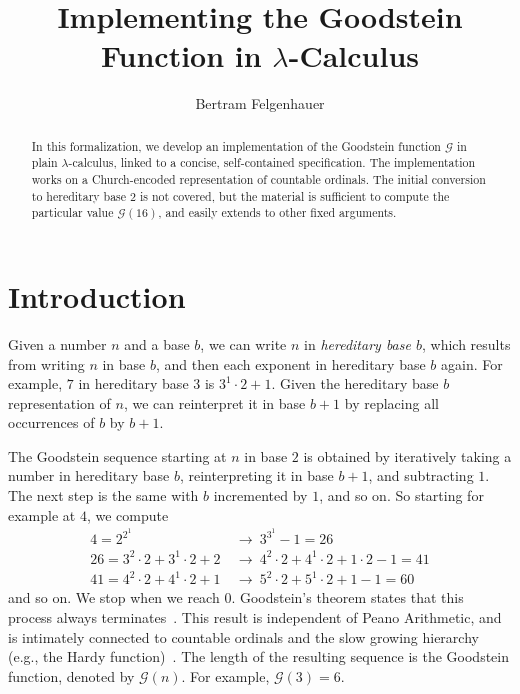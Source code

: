 \documentclass[11pt,a4paper]{article}
\begin{document}
\title{Implementing the Goodstein Function in $\lambda$-Calculus}
\author{Bertram Felgenhauer}
\maketitle

\begin{abstract}
In this formalization, we develop an implementation of the Goodstein
function $\mathcal{G}$ in plain $\lambda$-calculus, linked to a
concise, self-contained specification. The implementation works on a
Church-encoded representation of countable ordinals. The initial
conversion to hereditary base $2$ is not covered, but the material is
sufficient to compute the particular value $\mathcal{G}(16)$, and
easily extends to other fixed arguments.
\end{abstract}

\tableofcontents

\section{Introduction}

Given a number $n$ and a base $b$, we can write $n$ in
\emph{hereditary base $b$}, which results from writing $n$ in
base $b$, and then each exponent in hereditary base $b$ again.
For example, $7$ in hereditary base $3$ is $3^1 \cdot 2 + 1$.
Given the hereditary base $b$ representation of $n$,
we can reinterpret it in base $b+1$
by replacing all occurrences of $b$ by $b+1$.

The Goodstein sequence starting at $n$ in base $2$ is obtained by
iteratively taking a number in hereditary base $b$,
reinterpreting it in base $b+1$, and subtracting $1$.
The next step is the same with $b$ incremented by $1$, and so on.
So starting for example at $4$, we compute
\begin{align*}
4 = 2^{2^1}
&\:\to\: 3^{3^1} - 1
= 26\\
26 = 3^2 \cdot 2 + 3^1 \cdot 2 + 2
&\:\to\:
4^2 \cdot 2 + 4^1 \cdot 2 + 1 \cdot 2 - 1
= 41\\
41 =
4^2 \cdot 2 + 4^1 \cdot 2 + 1
&\:\to\:
5^2 \cdot 2 + 5^1 \cdot 2 + 1 - 1
= 60
\end{align*}
and so on.
We stop when we reach $0$.
Goodstein's theorem states that this process always terminates~\cite{G44}.
This result is independent of Peano Arithmetic,
and is intimately connected to countable ordinals and the
slow growing hierarchy (e.g., the Hardy function)~\cite{C83}.
The length of the resulting sequence is the Goodstein function,
denoted by $\mathcal G(n)$.
For example, $\mathcal G(3) = 6$.
\end{document}
